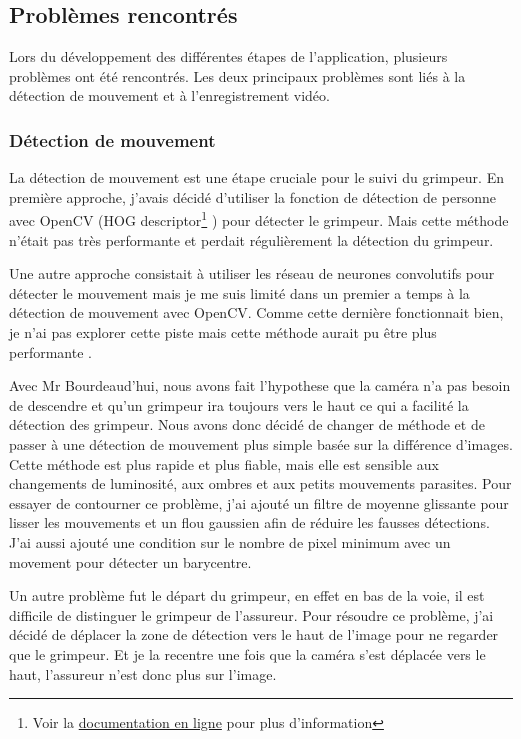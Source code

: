 \documentclass[a4paper, 11pt, french]{article}
\begin{document}

\subsection{Problèmes rencontrés}
Lors du développement des différentes étapes de l'application, plusieurs problèmes ont été rencontrés. Les deux principaux problèmes sont liés à la détection de mouvement et à l'enregistrement vidéo.

\subsubsection{Détection de mouvement}
La détection de mouvement est une étape cruciale pour le suivi du grimpeur. En première approche, j'avais décidé d'utiliser la fonction de détection de personne avec OpenCV (HOG descriptor\footnote{Voir la \href{https://docs.opencv.org/3.4/d5/d33/structcv_1_1HOGDescriptor.html}{documentation en ligne} pour plus d'information} \cite{hogDescriptor}) pour détecter le grimpeur. Mais cette méthode n'était pas très performante et perdait régulièrement la détection du grimpeur. 

Une autre approche consistait à utiliser les réseau de neurones convolutifs pour détecter le mouvement mais je me suis limité dans un premier a temps à la détection de mouvement avec OpenCV. Comme cette dernière fonctionnait bien, je n'ai pas explorer cette piste mais cette méthode aurait pu être plus performante \cite{CNNclimbertDetection}.

Avec Mr Bourdeaud'hui, nous avons fait l'hypothese que la caméra n'a pas besoin de descendre et qu'un grimpeur ira toujours vers le haut ce qui a facilité la détection des grimpeur. Nous avons donc décidé de changer de méthode et de passer à une détection de mouvement plus simple basée sur la différence d'images. Cette méthode est plus rapide et plus fiable, mais elle est sensible aux changements de luminosité, aux ombres et aux petits mouvements parasites. Pour essayer de contourner ce problème, j'ai ajouté un filtre de moyenne glissante pour lisser les mouvements et un flou gaussien afin de réduire les fausses détections. J'ai aussi ajouté une condition sur le nombre de pixel minimum avec un movement pour détecter un barycentre.

Un autre problème fut le départ du grimpeur, en effet en bas de la voie, il est difficile de distinguer le grimpeur de l'assureur. Pour résoudre ce problème, j'ai décidé de déplacer la zone de détection vers le haut de l'image pour ne regarder que le grimpeur. Et je la recentre une fois que la caméra s'est déplacée vers le haut, l'assureur n'est donc plus sur l'image.
\end{document}

